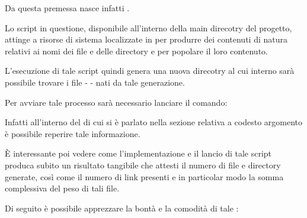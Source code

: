 \documentclass[letterpaper,10pt,italian,openany,oneside]{sphinxmanual}
\begin{document}
Da questa premessa nasce infatti .

Lo script in questione, disponibile all’interno della main direcotry del progetto, attinge a risorse di sistema localizzate
in  per produrre dei contenuti di natura  relativi ai nomi dei file e delle directory e
per popolare il loro contenuto.

L’esecuzione di tale script quindi genera una nuova direcotry  al cui interno sarà possibile
trovare i file -  - nati da tale generazione.

Per avviare tale processo sarà necessario lanciare il comando:

\begin{sphinxVerbatim}[commandchars=\\\{\}]
 
\end{sphinxVerbatim}

Infatti all’interno del  di cui si è parlato nella sezione relativa a codesto argomento è possibile reperire tale informazione.

È interessante poi vedere come l’implementazione e il lancio di tale script produca subito un risultato tangibile che attesti il numero di file
e directory generate, così come il numero di link presenti e in particolar modo la somma complessiva del peso di tali file.

Di seguito è possibile apprezzare la bontà e la comodità di tale :
\end{document}
